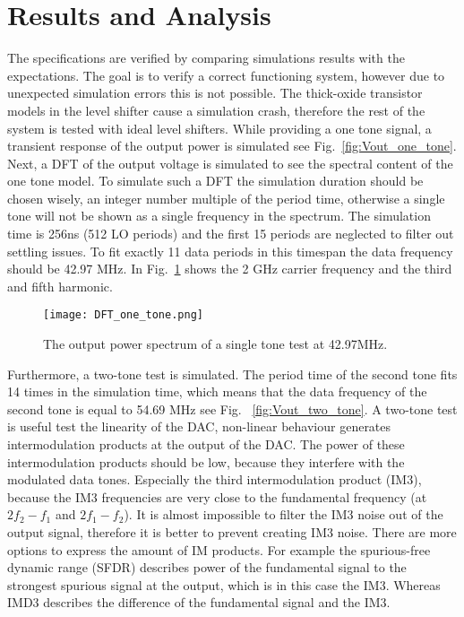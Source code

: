 \section{Results and Analysis}\label{sec:simulations}
The specifications are verified by comparing simulations results with the expectations. The goal is to verify a correct functioning system, however due to unexpected simulation errors this is not possible. The thick-oxide transistor models in the level shifter cause a simulation crash, therefore the rest of the system is tested with ideal level shifters.
While providing a one tone signal, a transient response of the output power is simulated see Fig.~\ref{fig:Vout_one_tone}.
Next, a DFT of the output voltage is simulated to see the spectral content of the one tone model. To simulate such a DFT the simulation duration should be chosen wisely, an integer number multiple of the period time, otherwise a single tone will not be shown as a single frequency in the spectrum. The simulation time is 256ns (512 LO periods) and the first 15 periods are neglected to filter out settling issues. To fit exactly 11 data periods in this timespan the data frequency should be 42.97 MHz. In Fig.~\ref{fig:DFT_one_tone} shows the 2 GHz carrier frequency and the third and fifth harmonic.
\begin{figure}[h] 
\texttt{[image: DFT\_one\_tone.png]}
\caption{The output power spectrum of a single tone test at 42.97MHz.}
\label{fig:DFT_one_tone}
\end{figure}
Furthermore, a two-tone test is simulated. The period time of the second tone fits 14 times in the simulation time, which means that the data frequency of the second tone is equal to 54.69 MHz see Fig. ~\ref{fig:Vout_two_tone}. A two-tone test is useful test the linearity of the DAC, non-linear behaviour generates intermodulation products at the output of the DAC. The power of these intermodulation products should be low, because they interfere with the modulated data tones. Especially the third intermodulation product (IM3), because the IM3 frequencies are very close to the fundamental frequency (at $2f_2-f_1$ and $2f_1-f_2$). It is almost impossible to filter the IM3 noise out of the output signal, therefore it is better to prevent creating IM3 noise. There are more options to express the amount of IM products. For example the spurious-free dynamic range (SFDR) describes power of the fundamental signal to the strongest spurious signal at the output, which is in this case the IM3. Whereas IMD3 describes the difference of the fundamental signal and the IM3.
